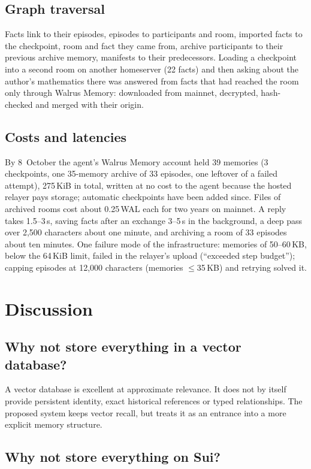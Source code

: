 \documentclass[11pt]{article}
\begin{document}
\subsection{Graph traversal}
Facts link to their episodes, episodes to participants and room, imported facts to the checkpoint, room and fact they came from, archive participants to their previous archive memory, manifests to their predecessors. Loading a checkpoint into a second room on another homeserver (22 facts) and then asking about the author's mathematics there was answered from facts that had reached the room only through Walrus Memory: downloaded from mainnet, decrypted, hash-checked and merged with their origin.

\subsection{Costs and latencies}
By 8~October the agent's Walrus Memory account held 39 memories (3 checkpoints, one 35-memory archive of 33 episodes, one leftover of a failed attempt), 275\,KiB in total, written at no cost to the agent because the hosted relayer pays storage; automatic checkpoints have been added since. Files of archived rooms cost about 0.25\,WAL each for two years on mainnet. A reply takes 1.5--3\,s, saving facts after an exchange 3--5\,s in the background, a deep pass over 2,500 characters about one minute, and archiving a room of 33 episodes about ten minutes. One failure mode of the infrastructure: memories of 50--60\,KB, below the 64\,KiB limit, failed in the relayer's upload (``exceeded step budget''); capping episodes at 12,000 characters (memories $\leq$35\,KB) and retrying solved it.

\section{Discussion}

\subsection{Why not store everything in a vector database?}

A vector database is excellent at approximate relevance. It does not by itself provide persistent identity, exact historical references or typed relationships. The proposed system keeps vector recall, but treats it as an entrance into a more explicit memory structure.

\subsection{Why not store everything on Sui?}
\end{document}

